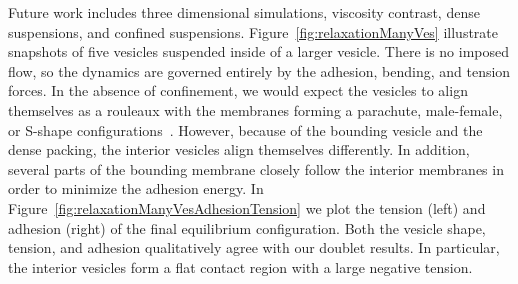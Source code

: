 \documentclass[prf,superscriptaddress,showpacs]{revtex4-1}
\begin{document}
Future work includes three dimensional simulations, viscosity contrast,
dense suspensions, and confined suspensions.
Figure~\ref{fig:relaxationManyVes} illustrate snapshots of five vesicles
suspended inside of a larger vesicle.  There is no imposed flow, so the
dynamics are governed entirely by the adhesion, bending, and tension
forces.  In the absence of confinement, we would expect the vesicles to
align themselves as a rouleaux with the membranes forming a parachute,
male-female, or S-shape
configurations~\cite{FlormannAouane2017_SciReports}.  However, because
of the bounding vesicle and the dense packing, the interior vesicles
align themselves differently.  In addition, several parts of the
bounding membrane closely follow the interior membranes in order to
minimize the adhesion energy.  In
Figure~\ref{fig:relaxationManyVesAdhesionTension} we plot the tension
(left) and adhesion (right) of the final equilibrium configuration.
Both the vesicle shape, tension, and adhesion qualitatively agree with
our doublet results.  In particular, the interior vesicles form a flat
contact region with a large negative tension.
\end{document}
